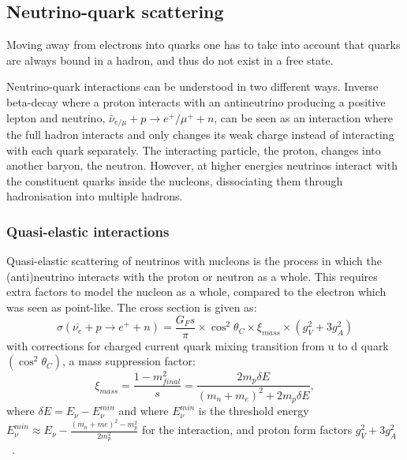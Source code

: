 \subsection{Neutrino-quark scattering}
Moving away from electrons into quarks one has to take into account that quarks are always bound in a hadron, and thus do not exist in a free state. 

Neutrino-quark interactions can be understood in two different ways. Inverse beta-decay where a proton interacts with an antineutrino producing a positive lepton and neutrino, $\bar{\nu}_{e/\mu} + p \rightarrow  e^+/\mu^+ + n$, can be seen as an interaction where the full hadron interacts and only changes its weak charge instead of interacting with each quark separately. The interacting particle, the proton, changes into another baryon, the neutron. However, at higher energies neutrinos interact with the constituent quarks inside the nucleons, dissociating them through hadronisation into multiple hadrons.


\subsubsection{Quasi-elastic interactions}
Quasi-elastic scattering of neutrinos with nucleons is the process in which the (anti)neutrino interacts with the proton or neutron as a whole.
This requires extra factors to model the nucleon as a whole, compared to the electron which was seen as point-like. The cross section is given as:
\begin{equation}
\sigma(\bar{\nu_e} + p \rightarrow e^+ + n) = \frac{G_Fs}{\pi} \times \cos^2 \theta_C \times \xi_{mass} \times (g^2_V + 3 g^2_A)
\end{equation}
with corrections for charged current quark mixing transition from u to d quark $( \cos^2 \theta_C)$, a mass suppression factor:
\begin{equation}
\xi_{mass}=\frac{1-m^2_{final}}{s} = \frac{2m_p \delta E}{(m_n+m_e)^2+2m_p \delta E},
\end{equation}  
where $\delta E = E_\nu - E_\nu^{min}$ and where $E_\nu ^{min}$ is the threshold energy $E_\nu ^{min} \approx E_\nu - \frac{(m_n+me)^2 - m_p^2}{2m_p^2}$  for the interaction, and proton form factors $g^2_V + 3 g^2_A$ ~\cite{47Soler}.


